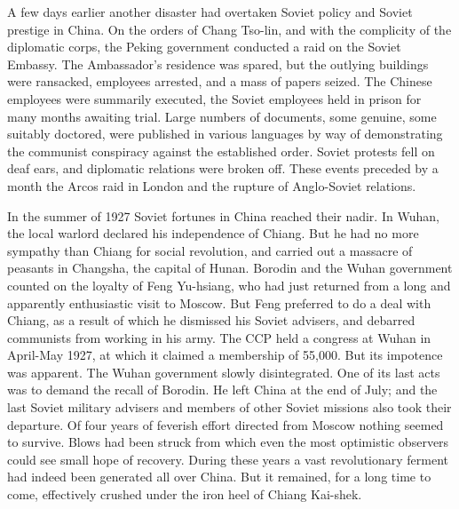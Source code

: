 A few days earlier another disaster had overtaken Soviet policy and Soviet prestige in China. On the orders of Chang Tso-lin, and with the complicity of the diplomatic corps, the Peking government conducted a raid on the Soviet Embassy. The Ambassador's residence was spared, but the outlying buildings were ransacked, employees arrested, and a mass of papers seized. The Chinese employees were summarily executed, the Soviet employees held in prison for many months awaiting trial. Large numbers of documents, some genuine, some suitably doctored, were published in various languages by way of demonstrating the communist conspiracy against the established order. Soviet protests fell on deaf ears, and diplomatic relations were broken off. These events preceded by a month the Arcos raid in London and the rupture of Anglo-Soviet relations. 

In the summer of 1927 Soviet fortunes in China reached their nadir. In Wuhan, the local warlord declared his independence of Chiang. But he had no more sympathy than Chiang for social revolution, and carried out a massacre of peasants in Changsha, the capital of Hunan. Borodin and the Wuhan government counted on the loyalty of Feng Yu-hsiang, who had just returned from a long and apparently enthusiastic visit to Moscow. But Feng preferred to do a deal with Chiang, as a result of which he dismissed his Soviet advisers, and debarred communists from working in his army. The CCP held a congress at Wuhan in April-May 1927, at which it claimed a membership of 55,000. But its impotence was apparent. The Wuhan government slowly disintegrated. One of its last acts was to demand the recall of Borodin. He left China at the end of July; and the last Soviet military advisers and members of other Soviet missions also took their departure. Of four years of feverish effort directed from Moscow nothing seemed to survive. Blows had been struck from which even the most optimistic observers could see small hope of recovery. During these years a vast revolutionary ferment had indeed been generated all over China. But it remained, for a long time to come, effectively crushed under the iron heel of Chiang Kai-shek. 

